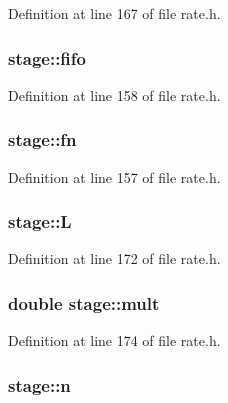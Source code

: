 Definition at line 167 of file rate.\+h.

\subsubsection[{\texorpdfstring{fifo}{fifo}}]{ stage\+::fifo}\hypertarget{structstage_aa051357fcd85b5303204529fe474f68b}{}\label{structstage_aa051357fcd85b5303204529fe474f68b}


Definition at line 158 of file rate.\+h.

\subsubsection[{\texorpdfstring{fn}{fn}}]{ stage\+::fn}\hypertarget{structstage_a100b125aca7f84217a26ca251b23374c}{}\label{structstage_a100b125aca7f84217a26ca251b23374c}


Definition at line 157 of file rate.\+h.

\subsubsection[{\texorpdfstring{L}{L}}]{ stage\+::L}\hypertarget{structstage_a5d95711da91e09f4da9f723556053c0d}{}\label{structstage_a5d95711da91e09f4da9f723556053c0d}


Definition at line 172 of file rate.\+h.

\subsubsection[{\texorpdfstring{mult}{mult}}]{\setlength{\rightskip}{0pt plus 5cm}double stage\+::mult}\hypertarget{structstage_a3cb7ea04aa9e3e145b0607f6244cb8de}{}\label{structstage_a3cb7ea04aa9e3e145b0607f6244cb8de}


Definition at line 174 of file rate.\+h.

\subsubsection[{\texorpdfstring{n}{n}}]{ stage\+::n}\hypertarget{structstage_a73628f0c9db77692ddd88d0b1474de36}{}\label{structstage_a73628f0c9db77692ddd88d0b1474de36}


